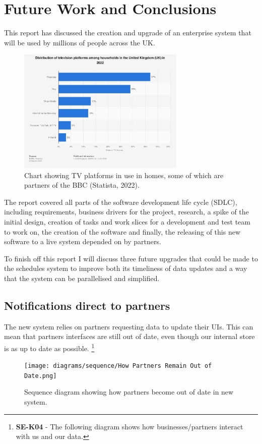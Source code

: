 \section{Future Work and Conclusions}
\label{sec:future}
This report has discussed the creation and upgrade of an enterprise system that will be used by millions of people across the UK.

\begin{figure}[H]
  \centering
  \includegraphics[width=8cm]{assets/tvPlatformChart.png}
  \caption{Chart showing TV platforms in use in homes, some of which are partners of the BBC (Statista, 2022).}
  \label{fig:tvPlatformChart}
\end{figure}

The report covered all parts of the software development life cycle (SDLC), including requirements, business drivers for the project, research,
a spike of the initial design, creation of tasks and work slices for a development and test team to work on, the creation of the software and
finally, the releasing of this new software to a live system depended on by partners.

To finish off this report I will discuss three future upgrades that could be made to the schedules system to improve both its timeliness of data updates
and a way that the system can be parallelised and simplified.

\newpage
\subsection{Notifications direct to partners}
The new system relies on partners requesting data to update their UIs. This can mean that partners interfaces are still out of date, even 
though our internal store is as up to date as possible.
\footnote{\textbf{SE-K04} - The following diagram shows how businesses/partners interact with us and our data.}

\begin{figure}[H]
  \centering
  \texttt{[image: diagrams/sequence/How Partners Remain Out of Date.png]}
  \caption{Sequence diagram showing how partners become out of date in new system.}
  \label{fig:sequenceOutOfDate}
\end{figure}

